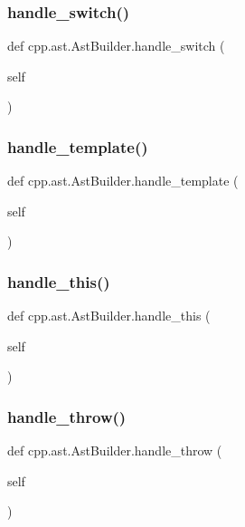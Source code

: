 \subsubsection{\texorpdfstring{handle\_switch()}{handle\_switch()}}
{\footnotesize\ttfamily def cpp.\+ast.\+Ast\+Builder.\+handle\+\_\+switch (\begin{DoxyParamCaption}\item[{}]{self }\end{DoxyParamCaption})}

\mbox{\label{classcpp_1_1ast_1_1AstBuilder_a0f4d74520697ec05eb6b549daada5a5d}} 
\subsubsection{\texorpdfstring{handle\_template()}{handle\_template()}}
{\footnotesize\ttfamily def cpp.\+ast.\+Ast\+Builder.\+handle\+\_\+template (\begin{DoxyParamCaption}\item[{}]{self }\end{DoxyParamCaption})}

\mbox{\label{classcpp_1_1ast_1_1AstBuilder_ad96a39776b5439fa9a5c2989f8da20cd}} 
\subsubsection{\texorpdfstring{handle\_this()}{handle\_this()}}
{\footnotesize\ttfamily def cpp.\+ast.\+Ast\+Builder.\+handle\+\_\+this (\begin{DoxyParamCaption}\item[{}]{self }\end{DoxyParamCaption})}

\mbox{\label{classcpp_1_1ast_1_1AstBuilder_ad4a308ded4a1f87e686b9e11fec31be9}} 
\subsubsection{\texorpdfstring{handle\_throw()}{handle\_throw()}}
{\footnotesize\ttfamily def cpp.\+ast.\+Ast\+Builder.\+handle\+\_\+throw (\begin{DoxyParamCaption}\item[{}]{self }\end{DoxyParamCaption})}

